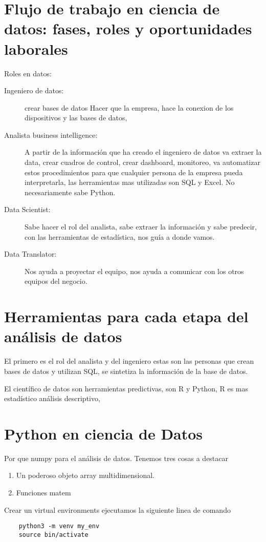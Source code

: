 \section{Flujo de trabajo en ciencia de datos: fases, roles y oportunidades laborales} 

Roles en datos: 

\begin{description}
	\item[Ingeniero de datos: ] crear bases de datos  Hacer que la empresa, hace la conexion de los dispositivos y las bases de datos,
	
	\item[Analista business intelligence: ] A partir de la informaci\'on que ha creado el ingeniero de datos va extraer la data, crear cuadros de control, crear dashboard, monitoreo, va automatizar estos procedimientos para que cualquier persona de la empresa pueda interpretarla, las herramientas mas utilizadas son SQL y Excel. No necesariamente sabe Python.
	
	\item[Data Scientist: ] Sabe hacer el rol del analista, sabe extraer la informaci\'on y sabe predecir, con las herramientas de estad\'istica, nos gu\'ia a donde vamos. 
	
	\item[Data Translator: ] Nos ayuda a proyectar el equipo, nos ayuda a comunicar con los otros equipos del negocio. 
	
	
\end{description}

\section{Herramientas para cada etapa del an\'alisis de datos}

El primero es el rol del analista y del ingeniero estas son las personas que crean bases de datos y utilizan SQL, se sintetiza la informaci\'on de la base de datos. 

El cient\'ifico de datos son herramientas predictivas, son R y Python, R es mas estad\'istico an\'alisis descriptivo, 

\section{Python en ciencia de Datos}

Por que numpy para el análisis de datos. Tenemos tres cosas a destacar 
\begin{enumerate}
	\item Un poderoso objeto array multidimensional.
	\item Funciones matem
\end{enumerate}

Crear un virtual environments ejecutamos la siguiente linea de comando

\begin{verbatim}
	python3 -m venv my_env
	source bin/activate
\end{verbatim}



